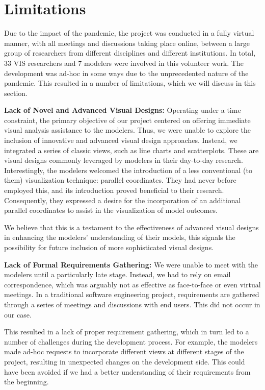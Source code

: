 \section{Limitations}

Due to the impact of the pandemic, the project was conducted in a fully virtual manner, with all meetings and discussions taking place online, between a large group of researchers from different disciplines and different institutions.
In total, 33 VIS researchers and 7 modelers were involved in this volunteer work.
The development was ad-hoc in some ways due to the unprecedented nature of the pandemic.
This resulted in a number of limitations, which we will discuss in this section.

\vspace*{3mm}
\noindent
\textbf{Lack of Novel and Advanced Visual Designs:}
Operating under a time constraint, the primary objective of our project centered on offering immediate visual analysis assistance to the modelers.
Thus, we were unable to explore the inclusion of innovative and advanced visual design approaches.
Instead, we integrated a series of classic views, such as line charts and scatterplots.
These are visual designs commonly leveraged by modelers in their day-to-day research.
Interestingly, the modelers welcomed the introduction of a less conventional (to them) visualization technique: parallel coordinates.
They had never before employed this, and its introduction proved beneficial to their research.
Consequently, they expressed a desire for the incorporation of an additional parallel coordinates to assist in the visualization of model outcomes.

We believe that this is a testament to the effectiveness of advanced visual designs in enhancing the modelers' understanding of their models, this signals the possibility for future inclusion of more sophisticated visual designs.

\vspace*{3mm}
\noindent
\textbf{Lack of Formal Requirements Gathering:}
We were unable to meet with the modelers until a particularly late stage. Instead, we had to rely on email correspondence, which was arguably not as effective as face-to-face or even virtual meetings.
In a traditional software engineering project, requirements are gathered through a series of meetings and discussions with end users. This did not occur in our case.

This resulted in a lack of proper requirement gathering, which in turn led to a number of challenges during the development process.
For example, the modelers made ad-hoc requests to incorporate different views at different stages of the project, resulting in unexpected changes on the development side.
This could have been avoided if we had a better understanding of their requirements from the beginning.

